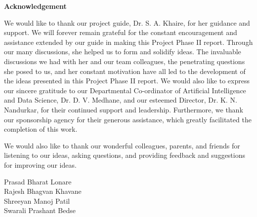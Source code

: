 \begin{center}
\bfseries \fontsize{24}{12} \selectfont Acknowledgement
\end{center}
\vspace*{1\baselineskip}
\hspace*{0.5in}We would like to thank our project guide, Dr. S. A. Khaire, for her guidance and support. We will forever remain grateful for the constant encouragement and assistance extended by our guide in making this Project Phase II report. Through our many discussions, she helped us to form and solidify ideas. The invaluable discussions we had with her and our team colleagues, the penetrating questions she posed to us, and her constant motivation have all led to the development of the ideas presented in this Project Phase II report. We would also like to express our sincere gratitude to our Departmental Co-ordinator of Artificial Intelligence and Data Science, Dr. D. V. Medhane, and our esteemed Director, Dr. K. N. Nandurkar, for their continued support and leadership. Furthermore, we thank our sponsorship agency for their generous assistance, which greatly facilitated the completion of this work.\

\hspace*{0.5in}We would also like to thank our wonderful colleagues, parents, and friends for listening to our ideas, asking questions, and providing feedback and suggestions for improving our ideas.\\

\vspace*{3\baselineskip} 
\begin{flushright}
Prasad Bharat Lonare \\
Rajesh Bhagvan Khavane \\
Shreeyan Manoj Patil \\
Swarali Prashant Bedse
\end{flushright}
